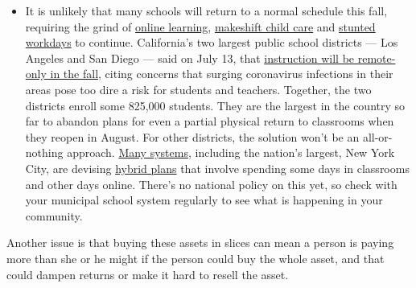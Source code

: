 \begin{itemize}
  \begin{itemize}
  \tightlist
  \item
    It is unlikely that many schools will return to a normal schedule
    this fall, requiring the grind of
    \href{https://www.nytimes.com/2020/06/05/us/coronavirus-education-lost-learning.html?action=click\&pgtype=Article\&state=default\&region=MAIN_CONTENT_3\&context=storylines_faq}{online
    learning},
    \href{https://www.nytimes.com/2020/05/29/us/coronavirus-child-care-centers.html?action=click\&pgtype=Article\&state=default\&region=MAIN_CONTENT_3\&context=storylines_faq}{makeshift
    child care} and
    \href{https://www.nytimes.com/2020/06/03/business/economy/coronavirus-working-women.html?action=click\&pgtype=Article\&state=default\&region=MAIN_CONTENT_3\&context=storylines_faq}{stunted
    workdays} to continue. California's two largest public school
    districts --- Los Angeles and San Diego --- said on July 13, that
    \href{https://www.nytimes.com/2020/07/13/us/lausd-san-diego-school-reopening.html?action=click\&pgtype=Article\&state=default\&region=MAIN_CONTENT_3\&context=storylines_faq}{instruction
    will be remote-only in the fall}, citing concerns that surging
    coronavirus infections in their areas pose too dire a risk for
    students and teachers. Together, the two districts enroll some
    825,000 students. They are the largest in the country so far to
    abandon plans for even a partial physical return to classrooms when
    they reopen in August. For other districts, the solution won't be an
    all-or-nothing approach.
    \href{https://bioethics.jhu.edu/research-and-outreach/projects/eschool-initiative/school-policy-tracker/}{Many
    systems}, including the nation's largest, New York City, are
    devising
    \href{https://www.nytimes.com/2020/06/26/us/coronavirus-schools-reopen-fall.html?action=click\&pgtype=Article\&state=default\&region=MAIN_CONTENT_3\&context=storylines_faq}{hybrid
    plans} that involve spending some days in classrooms and other days
    online. There's no national policy on this yet, so check with your
    municipal school system regularly to see what is happening in your
    community.
  \end{itemize}
\end{itemize}

Another issue is that buying these assets in slices can mean a person is
paying more than she or he might if the person could buy the whole
asset, and that could dampen returns or make it hard to resell the
asset.

